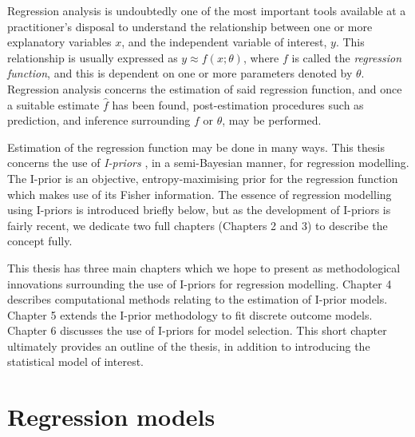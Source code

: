 \documentclass[a4paper,showframe,11pt]{report}
\begin{document}

Regression analysis is undoubtedly one of the most important tools available at a practitioner's disposal to understand the relationship between one or more explanatory variables $x$, and the independent variable of interest, $y$.
This relationship is usually expressed as $y \approx f(x;\theta)$, where $f$ is called the \emph{regression function}, and this is   dependent on one or more parameters denoted by $\theta$.
Regression analysis concerns the estimation of said regression function, and once a suitable estimate $\hat f$ has been found, post-estimation procedures such as prediction, and inference surrounding $f$ or $\theta$, may be performed.

Estimation of the regression function may be done in many ways.
This thesis concerns the use of \emph{I-priors} \citep{bergsma2017}, in a semi-Bayesian manner, for regression modelling.
The I-prior is an objective, entropy-maximising prior for the regression function which makes use of its Fisher information.
The essence of regression modelling using I-priors is introduced briefly below, but as the development of I-priors is fairly recent, we dedicate two full chapters (Chapters 2 and 3) to describe the concept fully.

This thesis has three main chapters which we hope to present as methodological innovations surrounding the use of I-priors for regression modelling.
Chapter 4 describes computational methods relating to the estimation of I-prior models.
Chapter 5 extends the I-prior methodology to fit discrete outcome models.
Chapter 6 discusses the use of I-priors for model selection. 
This short chapter ultimately provides an outline of the thesis, in addition to introducing the statistical model of interest.

\section{Regression models}
\end{document}
